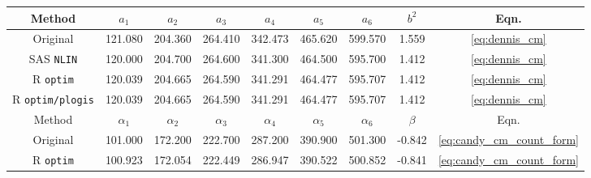 
\begin{tabular}{ccccccccc}
\toprule
Method & $a_1$ & $a_2$ & $a_3$ & $a_4$ & $a_5$ & $a_6$ & $b^2$ & Eqn.\\
\midrule
Original \citep{kemp1986stochastic} & 121.080 & 204.360 & 264.410 & 342.473 & 465.620 & 599.570 & 1.559 & \ref{eq:dennis_cm}\\
SAS \verb+NLIN+ & 120.000 & 204.700 & 264.600 & 341.300 & 464.500 & 595.700 & 1.412 & \ref{eq:dennis_cm}\\
R \verb+optim+ & 120.039 & 204.665 & 264.590 & 341.291 & 464.477 & 595.707 & 1.412 & \ref{eq:dennis_cm}\\
R \verb+optim/plogis+ & 120.039 & 204.665 & 264.590 & 341.291 & 464.477 & 595.707 & 1.412 & \ref{eq:dennis_cm}\\
\midrule Method & $\alpha_1$ & $\alpha_2$ & $\alpha_3$ & $\alpha_4$ & $\alpha_5$ & $\alpha_6$ & $\beta$ & Eqn. \\ \midrule
Original \citep{candy1991modeling} & 101.000 & 172.200 & 222.700 & 287.200 & 390.900 & 501.300 & -0.842 & \ref{eq:candy_cm_count_form}\\
\addlinespace
R \verb+optim+ & 100.923 & 172.054 & 222.449 & 286.947 & 390.522 & 500.852 & -0.841 & \ref{eq:candy_cm_count_form}\\
\bottomrule
\end{tabular}